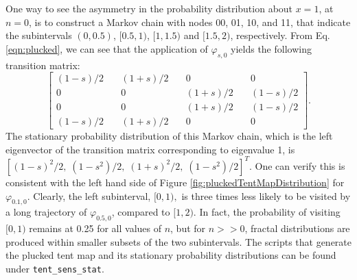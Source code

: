 One way to see the asymmetry in the probability distribution 
about $x=1$, at $n=0$, is to construct a Markov chain with nodes 00, 01, 10, and 11, that indicate the subintervals $(0,0.5)$, $[0.5,1)$, 
$[1,1.5)$ and $[1.5,2)$, respectively. From Eq. \ref{eqn:plucked}, we can see that the application of $\varphi_{s,0}$ yields the following transition matrix:
\[
\begin{bmatrix}
		(1-s)/2\quad & (1+s)/2 \quad & 0 \quad & 0 \\
		0 \quad & 0 \quad & (1+s)/2 \quad & (1-s)/2 \\
		0 \quad & 0  \quad & (1+s)/2 \quad & (1-s)/2 \\
		(1-s)/2 \quad & (1+s)/2 \quad & 0 \quad & 0
\end{bmatrix}
.\] 
The stationary probability distribution of this Markov chain, which 
is the left eigenvector of the transition matrix corresponding to eigenvalue 1, is $[(1-s)^2/2, \; (1-s^2)/2, \; (1+s)^2/2,\; (1-s^2)/2]^T$.
One can verify this is consistent with the left hand side of Figure \ref{fig:pluckedTentMapDistribution} for $\varphi_{0.1,0}$. Clearly, the left subinterval, $[0,1),$ is three times less likely to be visited by a long trajectory of $\varphi_{0.5,0}$, compared to $[1,2)$. In fact, the probability of visiting $[0,1)$ remains at 0.25 for all values of $n$, but for $n >> 0$, fractal distributions are produced within smaller subsets of the two subintervals. The scripts that generate the plucked tent map and its 
stationary probability distributions can be found under \verb+tent_sens_stat+. 

